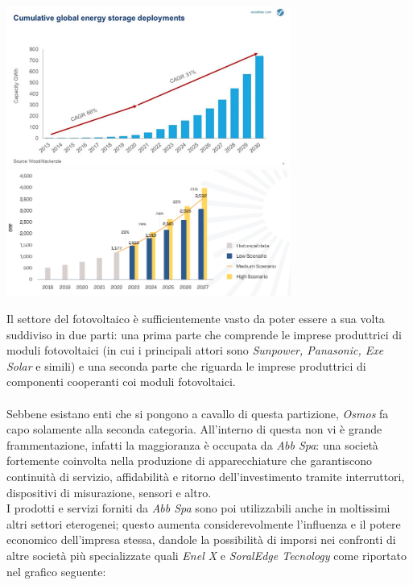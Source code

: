 \documentclass[a4paper, 12pt]{article}
\begin{document}
	\begin{center}
		\includegraphics[width=0.7\textwidth]{Images/previsioni_solare.jpg}
		\includegraphics[width=0.7\textwidth]{Images/andamento_pannelli2.png}
	\end{center}
	Il settore del fotovoltaico è sufficientemente vasto da poter essere a sua volta suddiviso in due parti: una prima parte che comprende le imprese produttrici di moduli fotovoltaici (in cui i principali attori sono \emph{Sunpower, Panasonic, Exe Solar} e simili) e una seconda parte che riguarda le imprese produttrici di componenti cooperanti coi moduli fotovoltaici.\\\\
	Sebbene esistano enti che si pongono a cavallo di questa partizione, \emph{Osmos} fa capo solamente alla seconda categoria. All'interno di questa non vi è grande frammentazione, infatti la maggioranza è occupata da \emph{Abb Spa}: una società fortemente coinvolta nella produzione di apparecchiature che garantiscono continuità di servizio, affidabilità e ritorno dell'investimento tramite interruttori, dispositivi di misurazione, sensori e altro.\\
	I prodotti e servizi forniti da \emph{Abb Spa} sono poi utilizzabili anche in moltissimi altri settori eterogenei; questo aumenta considerevolmente l'influenza e il potere economico dell'impresa stessa, dandole la possibilità di imporsi nei confronti di altre società più specializzate quali \emph{Enel X} e \emph{SoralEdge Tecnology} come riportato nel grafico seguente:\\
\end{document}
